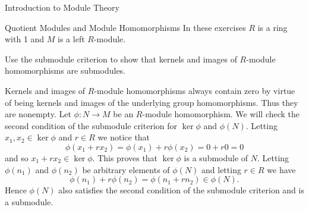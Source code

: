 \begin{chapter}{Introduction to Module Theory}
\begin{section}{Quotient Modules and Module Homomorphisms}
In these exercises $R$ is a ring with 1 and $M$ is a left $R$-module.
\begin{problem}\label{ex:10.2.1}
Use the submodule criterion to show that kernels and images of $R$-module homomorphisms are submodules.
\end{problem}
\begin{solution}Kernels and images of $R$-module homomorphisms always contain zero by virtue of being kernels and images of the underlying group homomorphisms. Thus they are nonempty. Let $\phi:N\to M$ be an $R$-module homomorphism. We will check the second condition of the submodule criterion for $\ker \phi$ and $\phi(N)$. Letting $x_1,x_2\in \ker \phi$ and $r\in R$ we notice that \[
\phi(x_1+rx_2) = \phi(x_1)+r\phi(x_2) = 0+r0 = 0
\]
and so $x_1+rx_2\in \ker \phi$. This proves that $\ker\phi$ is a submodule of $N$. Letting $\phi(n_1)$ and $\phi(n_2)$ be arbitrary elements of $\phi(N)$ and letting $r\in R$ we have \[
\phi(n_1) + r\phi(n_2) = \phi(n_1+rn_2) \in \phi(N).
\]
Hence $\phi(N)$ also satisfies the second condition of the submodule criterion and is a submodule.

\end{solution}\oneperpage




\end{section}
\end{chapter}
